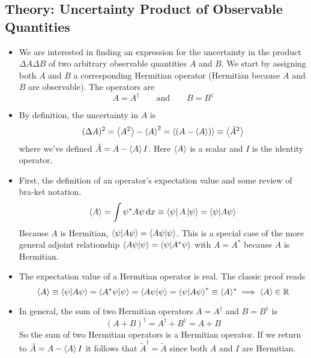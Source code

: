 \documentclass[11pt, a4paper]{article}
\newcommand{\diff}{\mathop{}\!\mathrm{d}} %
\newcommand{\eqtext}[1]{\qquad \text{#1} \qquad}
\begin{document}
\subsection{Theory: Uncertainty Product of Observable Quantities}
\begin{itemize}
	\item We are interested in finding an expression for the uncertainty in the product $ \Delta A \Delta B $ of two arbitrary observable quantities $ A $ and $ B $. We start by assigning both $ A $ and $ B $ a corresponding Hermitian operator (Hermitian because $ A $ and $ B $ are observable). The operators are
	\begin{equation*}
		A = A^{\dagger} \eqtext{and} B = B^{\dagger}
	\end{equation*}
	
	\item By definition, the uncertainty in $ A $ is
	\begin{equation*}
		(\Delta A)^{2} = \expval{A^{2}} - \expval{A}^{2} = \expval{(A - \expval{A})} \equiv \big\langle \tilde{A}^{2} \big\rangle
	\end{equation*}
	where we've defined $ \tilde{A} = A - \expval{A}I $. Here $ \expval{A} $ is a scalar and $ I $ is the identity operator. 
	
	\item First, the definition of an operator's expectation value and some review of bra-ket notation.
	\begin{equation*}
		\ev{A} = \int \psi^{*} A \psi \diff x \equiv \bra{\psi}A\ket{\psi} = \braket{\psi}{A\psi}
	\end{equation*}
	Because $ A $ is Hermitian, $ \braket{\psi}{A\psi} = \braket{A\psi}{\psi} $. This is a special case of the more general adjoint relationship $ \braket{A\psi}{\psi} = \braket{\psi}{A^{*}\psi} $ with $ A = A^{*} $ because $ A $ is Hermitian. 
	
	\item The expectation value of a Hermitian operator is real. The classic proof reads
	\begin{equation*}
		\ev{A} \equiv \braket{\psi}{A\psi} = \braket{A^{*}\psi}{\psi} = \braket{A\psi}{\psi} = \braket{\psi}{A\psi}^{*} \equiv \langle A \rangle^{*} \implies \langle A \rangle \in \mathbb{R}
	\end{equation*}
	
	\item In general, the sum of two Hermitian operators $ A = A^{\dagger} $ and $ B = B^{\dagger} $ is
	\begin{equation*}
		(A + B)^{\dagger} = A^{\dagger} + B^{\dagger} = A + B
	\end{equation*}
	So the sum of two Hermitian operators is a Hermitian operator. If we return to $ \tilde{A} = A - \expval{A}I  $ it follows that $ \tilde{A}^{\dagger} = \tilde{A} $ since both $ A $ and $ I $ are Hermitian.
	

\end{itemize}
\end{document}
